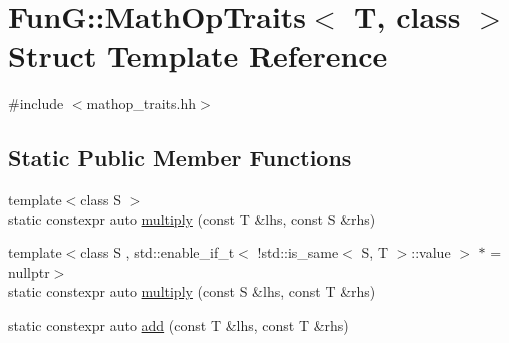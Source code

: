 \hypertarget{structFunG_1_1MathOpTraits}{\section{Fun\-G\-:\-:Math\-Op\-Traits$<$ T, class $>$ Struct Template Reference}
\label{structFunG_1_1MathOpTraits}
}


{\ttfamily \#include $<$mathop\-\_\-traits.\-hh$>$}

\subsection*{Static Public Member Functions}
\begin{DoxyCompactItemize}
\item 
{\footnotesize template$<$class S $>$ }\\static constexpr auto \hyperlink{structFunG_1_1MathOpTraits_aeafa649bb964e8280e50d46bc9de5f48}{multiply} (const T \&lhs, const S \&rhs)
\item 
{\footnotesize template$<$class S , std\-::enable\-\_\-if\-\_\-t$<$ !std\-::is\-\_\-same$<$ S, T $>$\-::value $>$ $\ast$  = nullptr$>$ }\\static constexpr auto \hyperlink{structFunG_1_1MathOpTraits_afa1a255520f22f9314dd200299375970}{multiply} (const S \&lhs, const T \&rhs)
\item 
static constexpr auto \hyperlink{structFunG_1_1MathOpTraits_a41f952d5f51ac17f9ed49218a6894605}{add} (const T \&lhs, const T \&rhs)
\end{DoxyCompactItemize}



